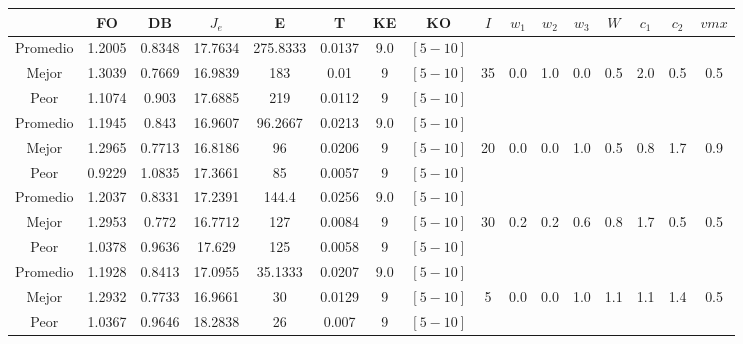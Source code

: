 \begin{table}[h!]
    \footnotesize
    \begin{center}
        \begin{tabular}{|c|c|c|c|c|c|c|c|c|c|c|c|c|c|c|c|}
        \hline
            & {\bf FO} & {\bf DB} & $J_e$ & {\bf E} & {\bf T} & {\bf KE} & {\bf KO} & $I$ & $w_1$ & $w_2$ & $w_3$ & $W$ & $c_1$ & $c_2$ & $vmx$ \\
        \hline
        \hline
            Promedio  & 1.2005 & 0.8348 & 17.7634 & 275.8333 & 0.0137 & 9.0 & $[5-10]$ &  &  &  &  &  &  &  & \\
            \cline{1-8}
            Mejor & 1.3039 & 0.7669  & 16.9839 & 183 & 0.01 & 9 & $[5-10]$ & 35 & 0.0 & 1.0 & 0.0 & 0.5 & 2.0 & 0.5 & 0.5\\
            \cline{1-8}
            Peor & 1.1074 & 0.903  & 17.6885 & 219 & 0.0112 & 9 & $[5-10]$ &  &  &  &  &  &  &  & \\
        \hline
        \hline
            Promedio  & 1.1945 & 0.843 & 16.9607 & 96.2667 & 0.0213 & 9.0 & $[5-10]$ &  &  &  &  &  &  &  & \\
            \cline{1-8}
            Mejor & 1.2965 & 0.7713  & 16.8186 & 96 & 0.0206 & 9 & $[5-10]$ & 20 & 0.0 & 0.0 & 1.0 & 0.5 & 0.8 & 1.7 & 0.9\\
            \cline{1-8}
            Peor & 0.9229 & 1.0835  & 17.3661 & 85 & 0.0057 & 9 & $[5-10]$ &  &  &  &  &  &  &  & \\
        \hline
        \hline
            Promedio  & 1.2037 & 0.8331 & 17.2391 & 144.4 & 0.0256 & 9.0 & $[5-10]$ &  &  &  &  &  &  &  & \\
            \cline{1-8}
            Mejor & 1.2953 & 0.772  & 16.7712 & 127 & 0.0084 & 9 & $[5-10]$ & 30 & 0.2 & 0.2 & 0.6 & 0.8 & 1.7 & 0.5 & 0.5\\
            \cline{1-8}
            Peor & 1.0378 & 0.9636  & 17.629 & 125 & 0.0058 & 9 & $[5-10]$ &  &  &  &  &  &  &  & \\
        \hline
        \hline
            Promedio  & 1.1928 & 0.8413 & 17.0955 & 35.1333 & 0.0207 & 9.0 & $[5-10]$ &  &  &  &  &  &  &  & \\
            \cline{1-8}
            Mejor & 1.2932 & 0.7733  & 16.9661 & 30 & 0.0129 & 9 & $[5-10]$ & 5 & 0.0 & 0.0 & 1.0 & 1.1 & 1.1 & 1.4 & 0.5\\
            \cline{1-8}
            Peor & 1.0367 & 0.9646  & 18.2838 & 26 & 0.007 & 9 & $[5-10]$ &  &  &  &  &  &  &  & \\
        \hline
        \hline

\end{tabular}
\end{center}
\end{table}
